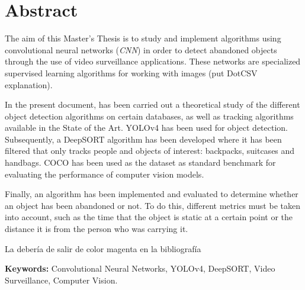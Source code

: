 
\chapter*{Abstract}
\label{cha:abstract}

\noindent
The aim of this Master's Thesis is to study and implement algorithms using convolutional neural networks (\textit{CNN}) in order to detect abandoned objects through the use of video surveillance applications. These networks are specialized supervised learning algorithms for working with images (put DotCSV explanation).

In the present document, has been carried out a theoretical study of the different object detection algorithms on certain databases, as well as tracking algorithms available in the State of the Art. YOLOv4 \cite{bochkovskiy2020yolov4} has been used for object detection. Subsequently, a DeepSORT algorithm \cite{Wojke2017simple} has been developed where it has been filtered that only tracks people and objects of interest: backpacks, suitcases and handbags. COCO \cite{lin2015microsoft} has been used as the dataset as standard benchmark for evaluating the performance of computer vision models.

Finally, an algorithm has been implemented and evaluated to determine whether an object has been abandoned or not. To do this, different metrics must be taken into account, such as the time that the object is static at a certain point or the distance it is from the person who was carrying it.

La \cite{qdiscs} debería de salir de color magenta en la bibliografía

\textbf{Keywords:} Convolutional Neural Networks, YOLOv4, DeepSORT, Video Surveillance, Computer Vision.